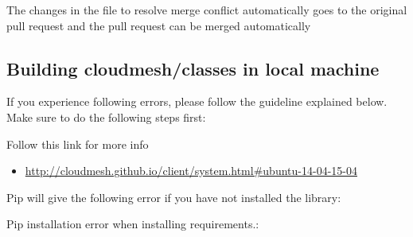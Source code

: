 The changes in the file to resolve merge conflict automatically goes
to the original pull request and the pull request can be merged
automatically


\subsection{Building cloudmesh/classes in local machine}
\label{\detokenize{faq:building-cloudmesh-classes-in-local-machine}}
If you experience following errors, please follow the guideline
explained below. Make sure to do the following steps first:

\begin{sphinxVerbatim}[commandchars=\\\{\}]
   
\end{sphinxVerbatim}

Follow this link for more info
\begin{itemize}
\item {} 
\url{http://cloudmesh.github.io/client/system.html\#ubuntu-14-04-15-04}

\end{itemize}

Pip will give the following error if you have not installed the library:

Pip installation error when installing requirements.:

